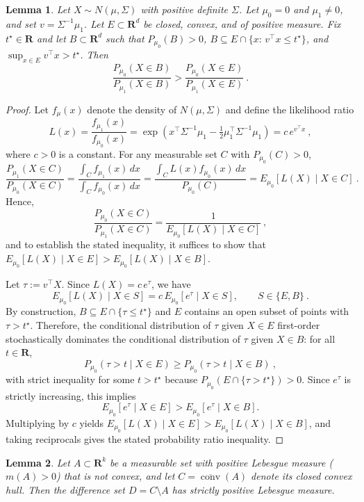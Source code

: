 \documentclass[12pt]{article}
\newtheorem{lemma}{Lemma}
\theoremstyle{definition}
\theoremstyle{remark}
\begin{document}
\begin{lemma}\label{lem:odd-ratio}
Let $X\sim N(\mu,\Sigma)$ with positive definite $\Sigma$. Let $\mu_0=0$ and $\mu_1\ne 0$, and set $v=\Sigma^{-1}\mu_1$. 
Let $E\subset\mathbf{R}^d$ be closed, convex, and of positive measure. Fix $t^\star\in\mathbf{R}$ and let $B\subset\mathbf{R}^d$ such that $P_{\mu_0}(B)>0$, $B \subseteq E\cap\{x:\, v^\top x \le t^\star\}$, and $\sup_{x\in E} v^\top x > t^\star$. Then
\[
\frac{P_{\mu_0}(X\in B)}{P_{\mu_1}(X\in B)} > \frac{P_{\mu_0}(X\in E)}{P_{\mu_1}(X\in E)}~.
\]
\end{lemma}

\begin{proof}
Let $f_\mu(x)$ denote the density of $N(\mu, \Sigma)$ and define the likelihood ratio
\[
L(x) = \frac{f_{\mu_1}(x)}{f_{\mu_0}(x)} 
= \exp\!\left(x^\top \Sigma^{-1}\mu_1 - \tfrac{1}{2}\mu_1^\top \Sigma^{-1}\mu_1\right)
= c\, e^{v^\top x}~,
\]
where $c>0$ is a constant. For any measurable set $C$ with $P_{\mu_0}(C) > 0$,
\[
\frac{P_{\mu_1}(X \in C)}{P_{\mu_0}(X \in C)} 
= \frac{\int_C f_{\mu_1}(x)\,dx}{\int_C f_{\mu_0}(x)\,dx}
= \frac{\int_C L(x) f_{\mu_0}(x)\,dx}{P_{\mu_0}(C)}
= E_{\mu_0}[L(X) \mid X \in C]~.
\]
Hence,
\[
\frac{P_{\mu_0}(X \in C)}{P_{\mu_1}(X \in C)} 
= \frac{1}{E_{\mu_0}[L(X) \mid X \in C]}~,
\]
and to establish the stated inequality, it suffices to show that 
$E_{\mu_0}[L(X) \mid X \in E] > E_{\mu_0}[L(X) \mid X \in B]$.

Let $\tau:=v^\top X$. Since $L(X)=c\,e^{\tau}$, we have
\[
E_{\mu_0}[L(X)\mid X\in S]=c\,E_{\mu_0}[e^{\tau}\mid X\in S],\qquad S\in\{E,B\}~.
\]
By construction, $B\subseteq E\cap\{\tau\le t^\star\}$ and $E$ contains an open subset of points with $\tau>t^\star$. Therefore, the conditional distribution of $\tau$ given $X\in E$ first-order stochastically dominates the conditional distribution of $\tau$ given $X\in B$:
for all $t \in\mathbf{R}$,
\[
P_{\mu_0}(\tau>t\mid X\in E) \ge P_{\mu_0}(\tau>t\mid X\in B)~,
\]
with strict inequality for some $t>t^\star$ because $P_{\mu_0}(E\cap\{\tau >t^\star\})>0$. Since $e^{\tau}$ is strictly increasing, this implies
\[
E_{\mu_0}[e^{\tau}\mid X\in E] > E_{\mu_0}[e^{\tau}\mid X\in B].
\]
Multiplying by $c$ yields $E_{\mu_0}[L(X)\mid X\in E]>E_{\mu_0}[L(X)\mid X\in B]$, and taking reciprocals gives the stated probability ratio inequality.
\end{proof}

\begin{lemma}\label{lem:positive-measure-D}
Let $A \subset \mathbf{R}^k$ be a measurable set with positive Lebesgue measure ($m(A)>0$) that is not convex, and let 
$C = \overline{\operatorname{conv}}(A)$ denote its closed convex hull.
Then the difference set $D = C \setminus A$ has strictly positive Lebesgue measure.
\end{lemma}
\end{document}
